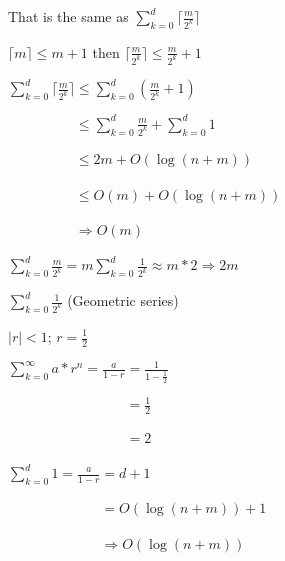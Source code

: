 \documentclass{article}
\begin{document}
That is the same as $\sum_{k=0}^{d} \lceil \frac{m}{2^k} \rceil$



$\lceil m \rceil \leq m + 1$ then $\lceil \frac{m}{2^k} \rceil \leq \frac{m}{2^k} + 1$



$\sum_{k=0}^{d} \lceil \frac{m}{2^k} \rceil \leq \sum_{k=0}^{d} (\frac{m}{2^k} + 1)$




$\phantom{\sum_{k=0}^{d} \lceil \frac{m}{2^k} \rceil} \leq \sum_{k=0}^{d} \frac{m}{2^k} + \sum_{k=0}^{d} 1$



$\phantom{\sum_{k=0}^{d} \lceil \frac{m}{2^k} \rceil} \leq 2m + O(\log (n+m))$



$\phantom{\sum_{k=0}^{d} \lceil \frac{m}{2^k} \rceil} \leq O(m) + O(\log (n+m))$



$\phantom{\sum_{k=0}^{d} \lceil \frac{m}{2^k} \rceil} \Rightarrow \boxed{O(m)}$



$\sum_{k=0}^{d} \frac{m}{2^k} = m \sum_{k=0}^{d} \frac{1}{2^k} \approx m * 2 \Rightarrow 2m$



$\sum_{k=0}^{d} \frac{1}{2^k}$ (Geometric series)



$|r| < 1$; $r = \frac{1}{2}$



$\sum_{k=0}^{\infty} a * r ^ n = \frac{a}{1-r} = \frac{1}{1-\frac{1}{2}}$



$\phantom{\sum_{k=0}^{\infty} a * r ^ n = \frac{a}{1-r}} = \frac{1}{2}$



$\phantom{\sum_{k=0}^{\infty} a * r ^ n = \frac{a}{1-r}} = 2$



$\sum_{k=0}^{d} 1 = \frac{a}{1-r} = d + 1$



$\phantom{\sum_{k=0}^{d} 1 = \frac{a}{1-r}} = O(\log (n+m)) + 1$



$\phantom{\sum_{k=0}^{d} 1 = \frac{a}{1-r}} \Rightarrow O(\log (n+m))$
\end{document}
